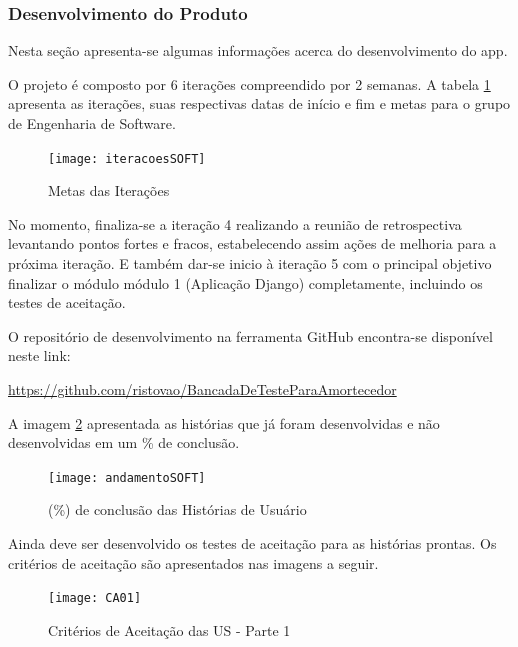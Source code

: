 
\subsubsection{Desenvolvimento do Produto}
	
	Nesta seção apresenta-se algumas informações acerca do desenvolvimento do app.

		
		O projeto é composto por 6 iterações compreendido por 2 semanas. A tabela \ref{iteracoesSOFT} apresenta as iterações, suas respectivas datas de início e fim e metas para o grupo de Engenharia de Software.

		\begin{figure}[htpb]
			\centering
			\texttt{[image: iteracoesSOFT]}
			\caption{Metas das Iterações}
			\label{iteracoesSOFT}
		\end{figure}

		No momento, finaliza-se a iteração 4 realizando a reunião de retrospectiva levantando pontos fortes e fracos, estabelecendo assim ações de melhoria para a próxima iteração. E também dar-se inicio à iteração 5 com o principal objetivo finalizar o módulo módulo 1 (Aplicação Django) completamente, incluindo os testes de aceitação.


		O repositório de desenvolvimento na ferramenta GitHub encontra-se disponível neste link:

		\href{https://github.com/ristovao/BancadaDeTesteParaAmortecedor}{https://github.com/ristovao/BancadaDeTesteParaAmortecedor}


		A imagem \ref{andamentoSOFT} apresentada as histórias que já foram desenvolvidas e não desenvolvidas em um \% de conclusão.

		\begin{figure}[htpb]
			\centering
			\texttt{[image: andamentoSOFT]}
			\caption{(\%) de conclusão das Histórias de Usuário}
			\label{andamentoSOFT}
		\end{figure}

		Ainda deve ser desenvolvido os testes de aceitação para as histórias prontas. Os critérios de aceitação são apresentados nas imagens a seguir.

		\newpage
		\begin{figure}[htpb]
			\centering
			\texttt{[image: CA01]}
			\caption{Critérios de Aceitação das US - Parte 1}
			\label{CA01}
		\end{figure}

